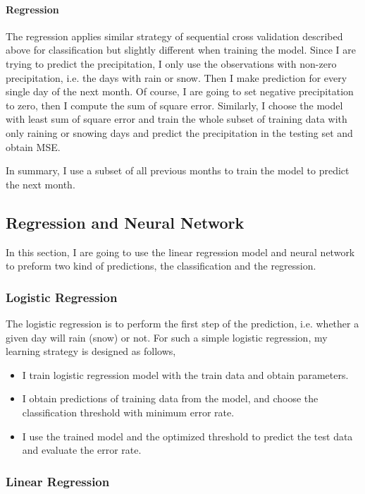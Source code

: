 \documentclass[a4paper,11pt]{article}
\begin{document}
\paragraph{Regression} The regression applies similar strategy of sequential cross validation described above for classification but slightly different when training the model. Since I are trying to predict the precipitation, I only use the observations with non-zero precipitation, i.e. the days with rain or snow. Then I make prediction for every single day of the next month. Of course, I are going to set negative precipitation to zero, then I compute the sum of square error. Similarly, I choose the model with least sum of square error and train the whole subset of training data with only raining or snowing days and predict the precipitation in the testing set and obtain MSE.

In summary, I use a subset of all previous months to train the model to predict the next month.

\subsection{Regression and Neural Network}

In this section, I are going to use the linear regression model and  neural network to preform two kind of predictions, the classification and the regression.\par

\subsubsection{Logistic Regression}

The logistic regression is to perform the first step of the prediction, i.e. whether a given day will rain (snow) or not. For such a simple logistic regression, my learning strategy is designed as follows,
\begin{itemize}
	\item I train logistic regression model with the train data and obtain parameters.
	\item I obtain predictions of training data from the model, and choose the classification threshold with minimum error rate.
	\item I use the trained model and the optimized threshold to predict the test data and evaluate the error rate.
\end{itemize}


\subsubsection{Linear Regression}
\end{document}
